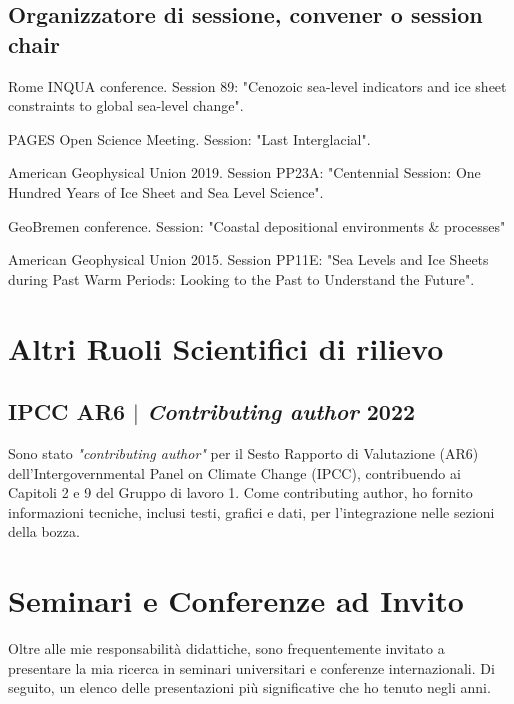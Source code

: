 \documentclass[11pt]{article}
\begin{document}
{\normalfont 
\subsection{Organizzatore di sessione, convener o session chair}}
{\footnotesize
\begin{description}
  \item [2023] Rome INQUA conference. Session 89: "Cenozoic sea-level indicators and ice sheet constraints to global sea-level change".
  \item [2022] PAGES Open Science Meeting. Session: "Last Interglacial".
  \item [2019] American Geophysical Union 2019. Session PP23A: "Centennial Session: One Hundred Years of Ice Sheet and Sea Level Science".
  \item [2017] GeoBremen conference. Session: "Coastal depositional environments \& processes"
  \item [2015] American Geophysical Union 2015. Session PP11E: "Sea Levels and Ice Sheets during Past Warm Periods: Looking to the Past to Understand the Future".
  \item \end{description}}

\section{Altri Ruoli Scientifici di rilievo}
\subsection{IPCC AR6 $|$ {\normalfont\textit{Contributing author}} \hfill 2022}
{\footnotesize Sono stato \textit{"contributing author"} per il Sesto Rapporto di Valutazione (AR6) dell'Intergovernmental Panel on Climate Change (IPCC), contribuendo ai Capitoli 2 e 9 del Gruppo di lavoro 1. Come contributing author, ho fornito informazioni tecniche, inclusi testi, grafici e dati, per l'integrazione nelle sezioni della bozza.}

\section{Seminari e Conferenze ad Invito}
{\normalfont Oltre alle mie responsabilità didattiche, sono frequentemente invitato a presentare la mia ricerca in seminari universitari e conferenze internazionali. Di seguito, un elenco delle presentazioni più significative che ho tenuto negli anni.}
\end{document}
